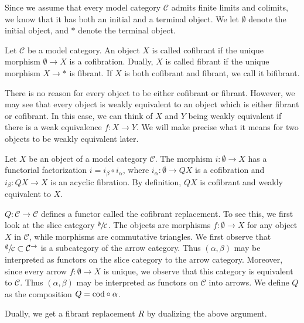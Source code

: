 \documentclass[../thesis.tex]{subfiles}
\begin{document}
            Since we assume that every model category $\mathcal{C}$ admits finite limits and colimits, we know that it has both an initial and a terminal object. We let $\emptyset$ denote the initial object, and $*$ denote the terminal object. 

            \begin{definition}
                Let $\mathcal{C}$ be a model category. An object $X$ is called cofibrant if the unique morphism $\emptyset \rightarrow X$ is a cofibration. Dually, $X$ is called fibrant if the unique morphism $X \rightarrow *$ is fibrant. If $X$ is both cofibrant and fibrant, we call it bifibrant.
            \end{definition}

            There is no reason for every object to be either cofibrant or fibrant. However, we may see that every object is weakly equivalent to an object which is either fibrant or cofibrant. In this case, we can think of $X$ and $Y$ being weakly equivalent if there is a weak equivalence $f: X \rightarrow Y$. We will make precise what it means for two objects to be weakly equivalent later.

            \begin{construction}
                Let $X$ be an object of a model category $\mathcal{C}$. The morphism $i:\emptyset\rightarrow X$ has a functorial factorization $i=i_\beta\circ i_\alpha$, where $i_\alpha: \emptyset\rightarrow QX$ is a cofibration and $i_\beta: QX\rightarrow X$ is an acyclic fibration. By definition, $QX$ is cofibrant and weakly equivalent to $X$.

                $Q: \mathcal{C}\rightarrow \mathcal{C}$ defines a functor called the cofibrant replacement. To see this, we first look at the slice category $\sfrac{\emptyset}{\mathcal{C}}$. The objects are morphisms $f:\emptyset \rightarrow X$ for any object $X$ in $\mathcal{C}$, while morphisms are commutative triangles. We first observe that $\sfrac{\emptyset}{\mathcal{C}}\subset\mathcal{C}^\rightarrow$ is a subcategory of the arrow category. Thus $(\alpha, \beta)$ may be interpreted as functors on the slice category to the arrow category. Moreover, since every arrow $f:\emptyset \rightarrow X$ is unique, we observe that this category is equivalent to $\mathcal{C}$. Thus $(\alpha, \beta)$ may be interpreted as functors on $\mathcal{C}$ into arrows. We define $Q$ as the composition $Q = \tt{cod} \circ \alpha$.

                Dually, we get a fibrant replacement $R$ by dualizing the above argument.
            \end{construction}
\end{document}
